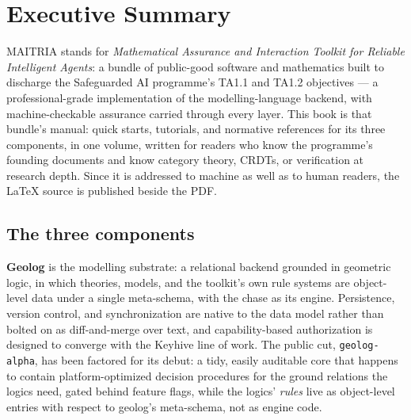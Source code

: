 \chapter{Executive Summary}
\label{ch:exec-summary}

\noindent\draftmark\medskip

MAITRIA stands for \emph{Mathematical Assurance and Interaction Toolkit
for Reliable Intelligent Agents}: a bundle of public-good software and
mathematics built to discharge the Safeguarded AI programme's TA1.1
and TA1.2 objectives --- a professional-grade implementation of the
modelling-language backend, with machine-checkable assurance carried
through every layer. This book is that bundle's manual: quick starts,
tutorials, and normative references for its three components, in one
volume, written for readers who know the programme's founding
documents and know
category theory, CRDTs, or verification at research depth. Since it
is addressed to machine as well as to human readers, the \LaTeX{}
source is published beside the PDF.

\section*{The three components}

\textbf{Geolog} is the modelling substrate: a relational backend
grounded in geometric logic, in which theories, models, and the
toolkit's own rule systems are object-level data under a single
meta-schema, with the chase as its engine. Persistence, version control, and
synchronization are native to the data model rather than bolted on as
diff-and-merge over text, and capability-based authorization is
designed to converge with the Keyhive line of work. The public cut,
\texttt{geolog-alpha}, has been factored for its debut: a tidy, easily
auditable core that happens to contain platform-optimized decision
procedures for the ground relations the logics need, gated behind
feature flags, while the logics' \emph{rules} live as object-level
entries with respect to geolog's meta-schema, not as engine code.

